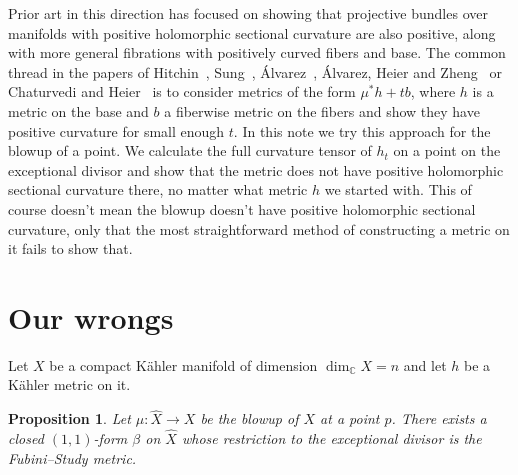\documentclass[10pt,a4paper]{amsart}
\newtheorem{prop}[theo]{Proposition}
\newcommand{\kk}[1]{\mathbb{#1}}
\def\fs{b}
\def\hsc{holomorphic sectional curvature}
\def\bl#1{\widehat{#1}}
\def\blX{\bl{X}}
\begin{document}
Prior art in this direction has focused on showing that projective bundles
over manifolds with positive \hsc{} are also positive, along with more
general fibrations with positively curved fibers and base.
The common thread in the papers of
Hitchin~\cite{hitchin1975curvature},
Sung~\cite{sung1997kahler},
\'Alvarez~\cite{alvarez2016positive},
\'Alvarez,
Heier and Zheng~\cite{alvarez2018projectivized} or Chaturvedi and
Heier~\cite{chaturvedi2020hermitian}
is to consider metrics of the form $\mu^* h + t \fs$, where $h$ is a metric
on the base and $\fs$ a fiberwise metric on the fibers and show they have
positive curvature for small enough $t$.
In this note we try this approach for the blowup of a point.
We calculate the full curvature tensor of $h_t$ on a point on the exceptional
divisor and show that the metric
does not have positive \hsc{} there, no matter what metric $h$ we started with.
This of course doesn't mean the blowup doesn't have positive \hsc{}, only that
the most straightforward method of constructing a metric on it fails to show that.





\section{Our wrongs}

Let $X$ be a compact K\"ahler manifold of dimension $\dim_{\kk C} X = n$
and let $h$ be a K\"ahler metric on it.


\begin{prop}
\label{prop:fs}
Let $\mu : \bl X \to X$ be the blowup of $X$ at a point $p$.
There exists a closed $(1,1)$-form $\beta$ on $\blX$ whose restriction to
the exceptional divisor is the Fubini--Study metric.
\end{prop}
\end{document}

